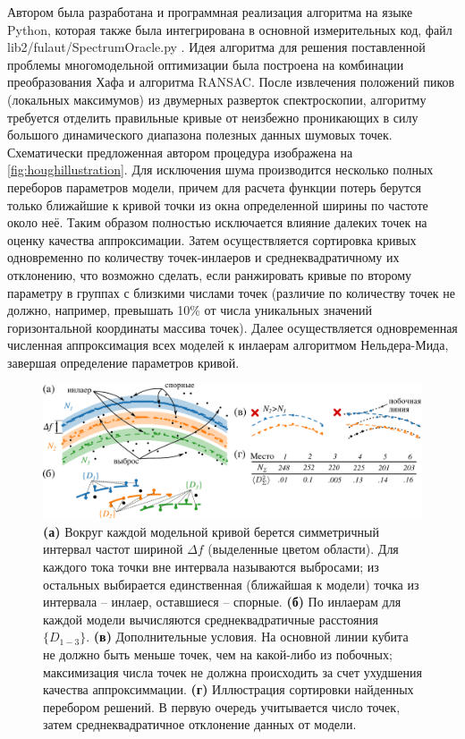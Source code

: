 \documentclass[14pt, a4paper]{extarticle}
\begin{document}
Автором была разработана и программная реализация алгоритма на языке Python, которая также была интегрирована в основной измерительных код, файл \foreignlanguage{english}{lib2/fulaut/SpectrumOracle.py} \cite{fedorov2021github}. Идея алгоритма для решения поставленной проблемы многомодельной оптимизации была построена на комбинации преобразования Хафа и алгоритма RANSAC. После извлечения положений пиков (локальных максимумов) из двумерных разверток спектроскопии, алгоритму требуется отделить правильные кривые от неизбежно проникающих в силу большого динамического диапазона полезных данных шумовых точек. Схематически предложенная автором процедура изображена на \autoref{fig:houghillustration}. Для исключения шума производится несколько полных переборов параметров модели, причем для расчета функции потерь берутся только ближайшие к кривой точки из окна определенной ширины по частоте около неё. Таким образом полностью исключается влияние далеких точек на оценку качества аппроксимации. Затем осуществляется сортировка кривых одновременно по количеству точек-инлаеров и среднеквадратичному их отклонению, что возможно сделать, если ранжировать кривые по второму параметру в группах с близкими числами точек (различие по количеству точек не должно, например, превышать 10\% от числа уникальных значений горизонтальной координаты массива точек). Далее осуществляется одновременная численная аппроксимация всех моделей к инлаерам алгоритмом Нельдера-Мида, завершая определение параметров кривой.

\begin{figure}
	\centering
	\includegraphics[width=\linewidth]{Pictures/hough_illustration}
	\caption{\textbf{(а)} Вокруг каждой модельной кривой берется симметричный интервал частот шириной $\Delta f$ (выделенные цветом области). Для каждого тока точки вне интервала называются выбросами; из остальных выбирается единственная (ближайшая к модели) точка из интервала -- инлаер, оставшиеся -- спорные. \textbf{(б)} По инлаерам для каждой модели вычисляются среднеквадратичные расстояния $\{D_{1-3}\}$. \textbf{(в)} Дополнительные условия. На основной линии кубита не должно быть меньше точек, чем на какой-либо из побочных; максимизация числа точек не должна происходить за счет ухудшения качества аппроксиммации. \textbf{(г)} Иллюстрация сортировки найденных перебором решений. В первую очередь учитывается число точек, затем среднеквадратичное отклонение данных от модели.}
	\label{fig:houghillustration}
\end{figure}
\end{document}
